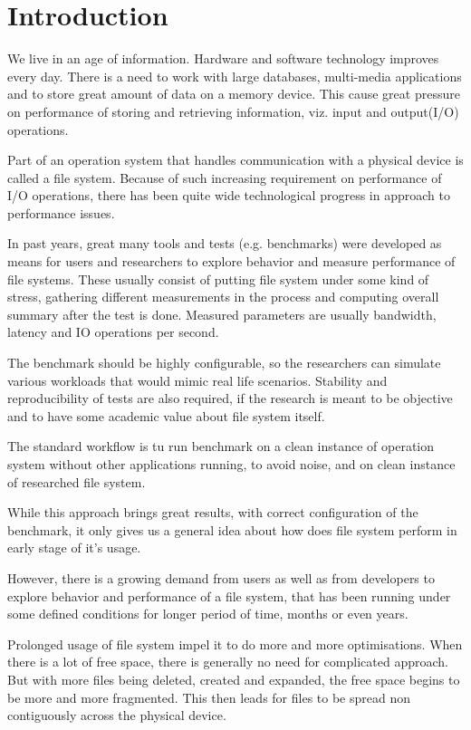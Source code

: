\documentclass[
  color, %
  table, %
  lof,   %
  lot,   %
]{fithesis3}
\begin{document}
\chapter{Introduction}
We live in an age of information. Hardware and software technology improves every day. There is a need to work with large databases, multi-media applications and to store great amount of data on a memory device. This cause great pressure on performance of storing and retrieving information, viz. input and output(I/O) operations.

Part of an operation system that handles communication with a physical device is called a file system. Because of such increasing requirement on performance of I/O operations, there has been quite wide technological progress in approach to performance issues. 

In past years, great many tools and tests (e.g. benchmarks) were developed as means for users and researchers to explore behavior and measure performance of file systems. These usually consist of putting file system under some kind of stress, gathering different measurements in the process and computing overall summary after the test is done. Measured parameters are usually bandwidth, latency and IO operations per second.

The benchmark should be highly configurable, so the researchers can simulate various workloads that would mimic real life scenarios. Stability and reproducibility of tests are also required, if the research is meant to be objective and to have some academic value about file system itself.

The standard workflow is tu run benchmark on a clean instance of operation system without other applications running, to avoid noise, and on clean instance of researched file system.

While this approach brings great results, with correct configuration of the benchmark, it only gives us a general idea about how does file system perform in early stage of it's usage. 

However, there is a growing demand from users as well as from developers to explore behavior and performance of a file system, that has been running under some defined conditions for longer period of time, months or even years.

Prolonged usage of file system impel it to do more and more optimisations. When there is a lot of free space, there is generally no need for complicated approach. But with more files being deleted, created and expanded, the free space begins to be more and more fragmented. This then leads for files to be spread non contiguously across the physical device.
\end{document}
